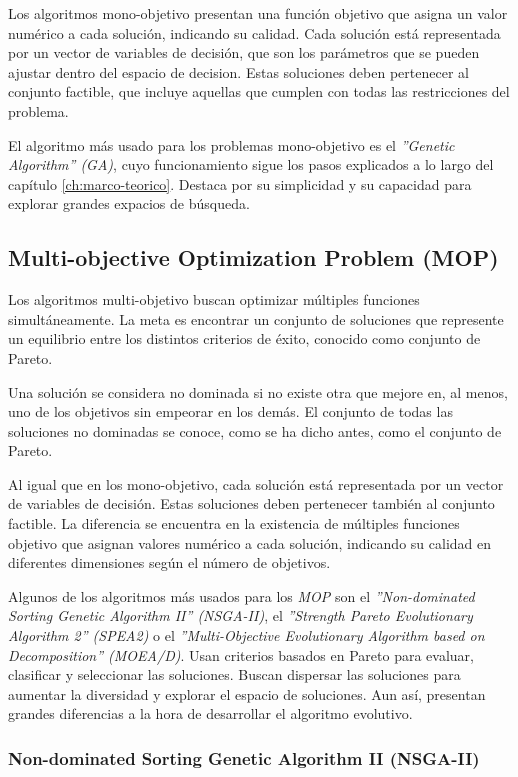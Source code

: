 Los algoritmos mono-objetivo presentan una función objetivo que asigna un valor numérico a cada solución, indicando su calidad. Cada solución está representada por un vector de variables de decisión, que son los parámetros que se pueden ajustar dentro del espacio de decision. Estas soluciones deben pertenecer al conjunto factible, que incluye aquellas que cumplen con todas las restricciones del problema.

El algoritmo más usado para los problemas mono-objetivo es el \textit{''Genetic Algorithm'' (GA)}, cuyo funcionamiento sigue los pasos explicados a lo largo del capítulo \ref{ch:marco-teorico}. Destaca por su simplicidad y su capacidad para explorar grandes expacios de búsqueda.

\subsection{Multi-objective Optimization Problem (MOP)}

Los algoritmos multi-objetivo buscan optimizar múltiples funciones simultáneamente. La meta es encontrar un conjunto de soluciones que represente un equilibrio entre los distintos criterios de éxito, conocido como conjunto de Pareto.

Una solución se considera no dominada si no existe otra que mejore en, al menos, uno de los objetivos sin empeorar en los demás. El conjunto de todas las soluciones no dominadas se conoce, como se ha dicho antes, como el conjunto de Pareto.

Al igual que en los mono-objetivo, cada solución está representada por un vector de variables de decisión. Estas soluciones deben pertenecer también al conjunto factible. La diferencia se encuentra en la existencia de múltiples funciones objetivo que asignan valores numérico a cada solución, indicando su calidad en diferentes dimensiones según el número de objetivos.

Algunos de los algoritmos más usados para los \textit{MOP} son el \textit{''Non-dominated Sorting Genetic Algorithm II'' (NSGA-II)}, el \textit{''Strength Pareto Evolutionary Algorithm 2'' (SPEA2)} o el \textit{''Multi-Objective Evolutionary Algorithm based on Decomposition'' (MOEA/D)}. Usan criterios basados en Pareto para evaluar, clasificar y seleccionar las soluciones. Buscan dispersar las soluciones para aumentar la diversidad y explorar el espacio de soluciones. Aun así, presentan grandes diferencias a la hora de desarrollar el algoritmo evolutivo.

\subsubsection{Non-dominated Sorting Genetic Algorithm II (NSGA-II)}
\label{ch:nsga2}

